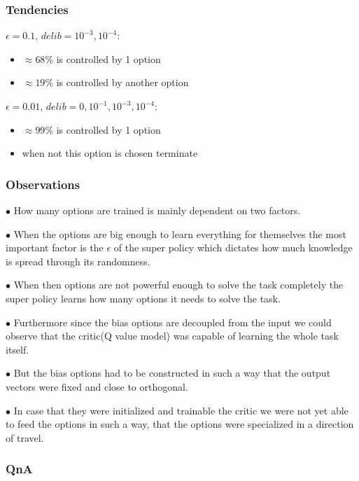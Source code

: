 \documentclass{beamer}
\begin{document}
\begin{frame}
\frametitle{Tendencies}

\underline{$\epsilon = 0.1$}, \underline{$delib = 10^{-3},10^{-4}$}: \pause
\begin{itemize}
\item $\approx 68$\% is controlled by 1 option \pause
\item $\approx 19$\% is controlled by another option \pause
\end{itemize}

\underline{$\epsilon = 0.01$}, \underline{$delib = 0 ,10^{-1}, 10^{-3},10^{-4}$}: \pause
\begin{itemize}
\item $\approx 99$\% is controlled by 1 option \pause
\item when not this option is chosen terminate
\end{itemize}

\end{frame}

\begin{frame}
\frametitle{Observations}

$\bullet$ How many options are trained is mainly dependent on two factors. \pause

$\bullet$ When the options are big enough to learn everything for themselves the most important factor is the $\epsilon$ of the super policy which dictates how much knowledge is spread through its randomness.\pause

$\bullet$ When then options are not powerful enough to solve the task completely the super policy learns how many options it needs to solve the task. \pause

$\bullet$ Furthermore since the bias options are decoupled from the input we could observe that the critic(Q value model) was capable of learning the whole task itself. \pause

$\bullet$ But the bias options had to be constructed in such a way that the output vectors were fixed and close to orthogonal. \pause

$\bullet$ In case that they were initialized and trainable the critic we were not yet able to feed the options in such a way, that the options were specialized in a direction of travel.


\end{frame}

\begin{frame}

\end{frame}

\begin{frame}
\frametitle{QnA}
\end{frame}
\end{document}
